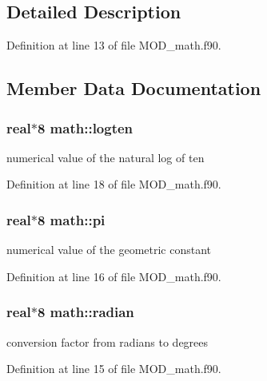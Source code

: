 \subsection{Detailed Description}


Definition at line 13 of file M\-O\-D\-\_\-math.\-f90.



\subsection{Member Data Documentation}
\hypertarget{classmath_a8691ad8a010a0a20ca259a70ea8bf242}{
\subsubsection[{logten}]{\setlength{\rightskip}{0pt plus 5cm}real$\ast$8 math\-::logten}}\label{classmath_a8691ad8a010a0a20ca259a70ea8bf242}


numerical value of the natural log of ten 



Definition at line 18 of file M\-O\-D\-\_\-math.\-f90.

\hypertarget{classmath_a150fc8a877628e302d3a2c349b1d38e1}{
\subsubsection[{pi}]{\setlength{\rightskip}{0pt plus 5cm}real$\ast$8 math\-::pi}}\label{classmath_a150fc8a877628e302d3a2c349b1d38e1}


numerical value of the geometric constant 



Definition at line 16 of file M\-O\-D\-\_\-math.\-f90.

\hypertarget{classmath_a9d21837b0d1dba1f56f6b55213417e1e}{
\subsubsection[{radian}]{\setlength{\rightskip}{0pt plus 5cm}real$\ast$8 math\-::radian}}\label{classmath_a9d21837b0d1dba1f56f6b55213417e1e}


conversion factor from radians to degrees 



Definition at line 15 of file M\-O\-D\-\_\-math.\-f90.

